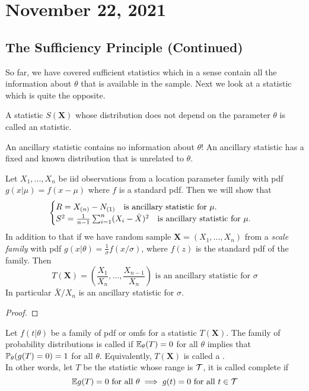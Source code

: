 \section{November 22, 2021}
\subsection{The Sufficiency Principle (Continued)}
So far, we have covered sufficient statistics which in a sense contain all the information about $\theta$ that is available in the sample. Next we look at a statistic which is quite the opposite.
\begin{definition}
    A statistic $S(\boldsymbol{X})$ whose distribution does not depend on the parameter
    $\theta$ is called an  statistic.
\end{definition}
An ancillary statistic contains no information about $\theta$! An ancillary statistic has a fixed and known distribution that is unrelated to $\theta.$
\begin{example}
    Let $X_1,...,X_n$ be iid observations from a location parameter family with pdf $g(x|\mu) = f(x-\mu)$ where $f$ is a standard pdf. Then we will show that
    $$
    \begin{cases}
        R = X_{(n)} - N_{(1)} \quad \text{is ancillary statistic for } \mu. \\
        S^2 = \frac{1}{n-1} \sum_{i=1}^{n}(X_i - \Bar{X})^2 \quad \text{is ancillary statistic for } \mu.
    \end{cases}
    $$ 
    In addition to that if we have random sample $\boldsymbol{X} = (X_1,...,X_n)$ from a \textit{scale family} with pdf $g(x|\theta) = \frac{1}{\sigma}f(x/\sigma)$, where $f(z)$ is the standard pdf of the family. Then
    $$
    T(\boldsymbol{X}) = \left( 
    \frac{X_1}{X_n},...,\frac{X_{n-1}}{X_n} 
    \right)
    \text{ is an ancillary statistic for }\sigma
    $$
    In particular $\bar{X}/X_n$ is an ancillary statistic for $\sigma$.
    \begin{proof}
        
    \end{proof}
\end{example}
\begin{definition}
    Let $f(t|\theta)$ be a family of pdf or omfs for a statistic $T(\boldsymbol{X})$. The family of probability distributions is called  if $\mathbb E_{\theta}(T) = 0$ for all $\theta$ implies that $\mathbb P_{\theta}(g(T) =0) =1$ for all $\theta$. Equivalently, $T(\boldsymbol{X})$ is called a .
    \\
    In other words, let $T$ be the statistic whose range is $\mathcal T$, it is called complete if
    $$
    \mathbb E g(T) = 0 \text{ for all } \theta \implies g(t) =0 \text{ for all } t \in \mathcal T
    $$
\end{definition}
